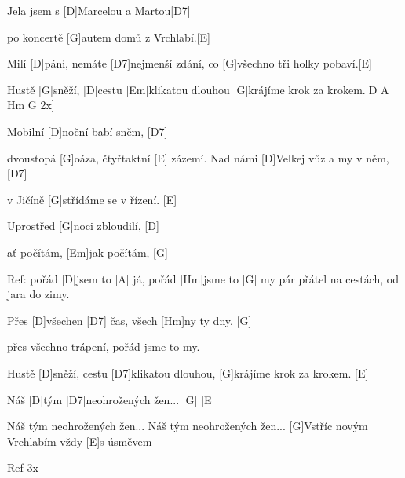 
Jela jsem s [D]Marcelou a Martou[D7]

po koncertě [G]autem domů z Vrchlabí.[E]

Milí [D]páni, nemáte [D7]nejmenší zdání,
co [G]všechno tři holky pobaví.[E]


Hustě [G]sněží, [D]cestu [Em]klikatou dlouhou
[G]krájíme krok za krokem.[D A Hm G 2x]

Mobilní [D]noční babí sněm, [D7]

dvoustopá [G]oáza, čtyřtaktní [E] zázemí.
Nad námi [D]Velkej vůz a my v něm, [D7]

v Jičíně [G]střídáme se v řízení. [E]


Uprostřed [G]noci zbloudilí, [D]

ať počítám, [Em]jak počítám, [G]


Ref: pořád [D]jsem to [A] já,
pořád [Hm]jsme to [G] my
pár přátel na cestách,
od jara do zimy.

Přes [D]všechen [D7] čas,
všech [Hm]ny ty dny, [G]

přes všechno trápení,
pořád jsme to my.

Hustě [D]sněží, cestu [D7]klikatou dlouhou,
[G]krájíme krok za krokem. [E]

Náš [D]tým [D7]neohrožených žen... [G] [E]

Náš tým neohrožených žen...
Náš tým neohrožených žen...
[G]Vstříc novým Vrchlabím
vždy [E]s úsměvem

Ref 3x




